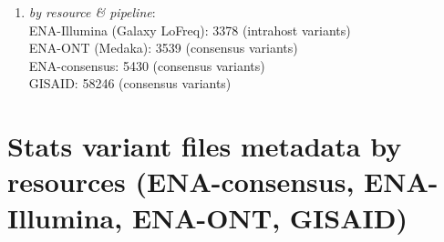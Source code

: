 \documentclass[a4paper, 10pt]{article}        %
\begin{document}
\begin{enumerate}
\item[] \textsl{by resource \& pipeline}: \\
ENA-Illumina (Galaxy LoFreq): 3378  (intrahost variants) \\
ENA-ONT (Medaka): 3539 (consensus variants)\\
ENA-consensus: 5430 (consensus variants)\\
GISAID: 58246 (consensus variants)\\











 \end{enumerate}
 
 \newpage
\section{Stats variant files metadata by resources (ENA-consensus, ENA-Illumina, ENA-ONT, GISAID)}
\end{document}
